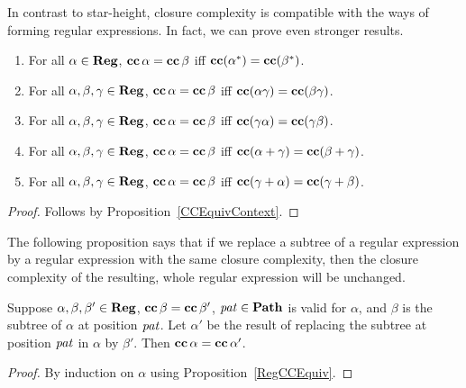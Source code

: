 In contrast to star-height, closure complexity is compatible with the
ways of forming regular expressions.  In fact, we can prove even
stronger results.

\begin{proposition}
\label{RegCCEquiv}
\begin{enumerate}[\quad(1)]
\item For all $\alpha\in\mathbf{Reg}$, $\mathbf{cc}\,\alpha = \mathbf{cc}\,\beta$
  iff $\mathbf{cc}(\alpha^*) = \mathbf{cc}(\beta^*)$.

\item For all $\alpha,\beta,\gamma\in\mathbf{Reg}$, $\mathbf{cc}\,\alpha = \mathbf{cc}\,\beta$
  iff $\mathbf{cc}(\alpha\gamma) = \mathbf{cc}(\beta\gamma)$.

\item For all $\alpha,\beta,\gamma\in\mathbf{Reg}$, $\mathbf{cc}\,\alpha = \mathbf{cc}\,\beta$
  iff $\mathbf{cc}(\gamma\alpha) = \mathbf{cc}(\gamma\beta)$.

\item For all $\alpha,\beta,\gamma\in\mathbf{Reg}$, $\mathbf{cc}\,\alpha = \mathbf{cc}\,\beta$
  iff $\mathbf{cc}(\alpha + \gamma) = \mathbf{cc}(\beta + \gamma)$.

\item For all $\alpha,\beta,\gamma\in\mathbf{Reg}$, $\mathbf{cc}\,\alpha = \mathbf{cc}\,\beta$
  iff $\mathbf{cc}(\gamma + \alpha) = \mathbf{cc}(\gamma + \beta)$.
\end{enumerate}
\end{proposition}

\begin{proof}
Follows by Proposition~\ref{CCEquivContext}.
\end{proof}

The following proposition says that if we replace a subtree of
a regular expression by a regular expression with the same closure
complexity, then the closure complexity of the
resulting, whole regular expression will be unchanged.

\begin{proposition}
\label{RegCCEquivSubstituteSubtree}

Suppose $\alpha,\beta,\beta'\in\mathbf{Reg}$, $\mathbf{cc}\,\beta = \mathbf{cc}\,\beta'$,
${\it pat}\in\mathbf{Path}$ is valid for $\alpha$, and $\beta$ is
the subtree of $\alpha$ at position ${\it pat}$.
Let $\alpha'$ be the result of replacing the subtree at
position ${\it pat}$ in $\alpha$ by $\beta'$. Then $\mathbf{cc}\,\alpha =
\mathbf{cc}\,\alpha'$.
\end{proposition}

\begin{proof}
By induction on $\alpha$ using Proposition~\ref{RegCCEquiv}.
\end{proof}

